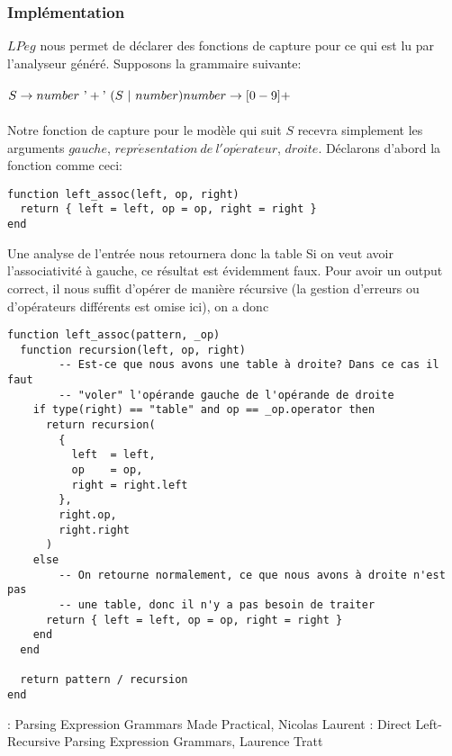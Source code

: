 \documentclass{article}
\begin{document}
\subsubsection{Implémentation}
$LPeg$ nous permet de déclarer des fonctions de capture pour ce qui est lu par l'analyseur généré. Supposons la grammaire suivante: \\ \\
\begin{math}
S \rightarrow number \ \textrm{'}+\textrm{'} \ (S \ | \ number) \\
number \rightarrow [0-9]+
\end{math} \\ \\
Notre fonction de capture pour le modèle qui suit $S$ recevra simplement les arguments $gauche$, $repr\acute{e}sentation \ de \ l'op\acute{e}rateur$, $droite$. Déclarons d'abord la fonction comme ceci:
\begin{verbatim}
function left_assoc(left, op, right)
  return { left = left, op = op, right = right }
end
\end{verbatim}
Une analyse de l'entrée  \noindent nous retournera donc la table 
\noindent Si on veut avoir l'associativité à gauche, ce résultat est évidemment faux. Pour avoir un output correct, il nous suffit d'opérer de manière récursive (la gestion d'erreurs ou d'opérateurs différents est omise ici), on a donc
\begin{verbatim}
function left_assoc(pattern, _op)
  function recursion(left, op, right)
		-- Est-ce que nous avons une table à droite? Dans ce cas il faut
		-- "voler" l'opérande gauche de l'opérande de droite
    if type(right) == "table" and op == _op.operator then
      return recursion(
        {
          left  = left,
          op    = op,
          right = right.left
        },
        right.op,
        right.right
      )
    else 
	    -- On retourne normalement, ce que nous avons à droite n'est pas
	    -- une table, donc il n'y a pas besoin de traiter
      return { left = left, op = op, right = right }
    end
  end
  
  return pattern / recursion
end
\end{verbatim}
\newpage
\noindent[1]: Parsing Expression Grammars Made Practical, Nicolas Laurent \newline
[2]: Direct Left-Recursive Parsing Expression Grammars, Laurence Tratt
\end{document}
